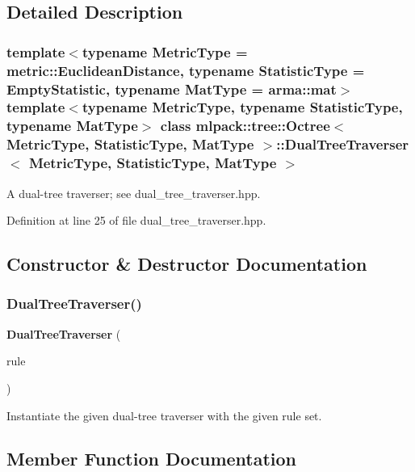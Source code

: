 \subsection{Detailed Description}
\subsubsection*{template$<$typename Metric\+Type = metric\+::\+Euclidean\+Distance, typename Statistic\+Type = Empty\+Statistic, typename Mat\+Type = arma\+::mat$>$\newline
template$<$typename Metric\+Type, typename Statistic\+Type, typename Mat\+Type$>$\newline
class mlpack\+::tree\+::\+Octree$<$ Metric\+Type, Statistic\+Type, Mat\+Type $>$\+::\+Dual\+Tree\+Traverser$<$ Metric\+Type, Statistic\+Type, Mat\+Type $>$}

A dual-\/tree traverser; see dual\+\_\+tree\+\_\+traverser.\+hpp. 

Definition at line 25 of file dual\+\_\+tree\+\_\+traverser.\+hpp.



\subsection{Constructor \& Destructor Documentation}
\mbox{\label{classmlpack_1_1tree_1_1Octree_1_1DualTreeTraverser_abd4227fd4d7e7f3e1090233443cc265e}} 
\subsubsection{Dual\+Tree\+Traverser()}
{\footnotesize\ttfamily \textbf{ Dual\+Tree\+Traverser} (\begin{DoxyParamCaption}\item[{Rule\+Type \&}]{rule }\end{DoxyParamCaption})}



Instantiate the given dual-\/tree traverser with the given rule set. 



\subsection{Member Function Documentation}
\mbox{\label{classmlpack_1_1tree_1_1Octree_1_1DualTreeTraverser_afc2a1471e0354570c99c25473d32433e}} 
